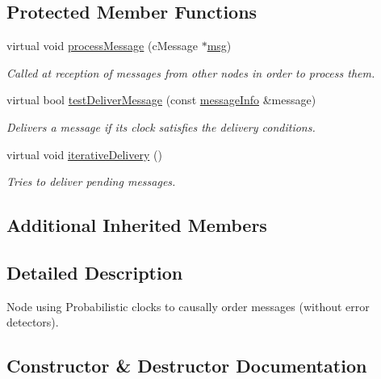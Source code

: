 \subsection*{Protected Member Functions}
\begin{DoxyCompactItemize}
\item 
virtual void \hyperlink{class_node_p_c_aa5fedc4136104a06e2f1131f1ba16b0e}{process\+Message} (c\+Message $\ast$\hyperlink{_controller_8h_afa0f3b802fbc219228f7bb97996fa558}{msg})
\begin{DoxyCompactList}\small\item\em Called at reception of messages from other nodes in order to process them. \end{DoxyCompactList}\item 
virtual bool \hyperlink{class_node_p_c_a54731196935596e0c6f094a5a8420134}{test\+Deliver\+Message} (const \hyperlink{structures_8h_a7e7bdc1d2fff8a9436f2f352b2711ed6}{message\+Info} \&message)
\begin{DoxyCompactList}\small\item\em Delivers a message if its clock satisfies the delivery conditions. \end{DoxyCompactList}\item 
virtual void \hyperlink{class_node_p_c_a7ac363db597ebadd3b18dd4343440aa1}{iterative\+Delivery} ()
\begin{DoxyCompactList}\small\item\em Tries to deliver pending messages. \end{DoxyCompactList}\end{DoxyCompactItemize}
\subsection*{Additional Inherited Members}


\subsection{Detailed Description}
Node using Probabilistic clocks to causally order messages (without error detectors). 



\subsection{Constructor \& Destructor Documentation}
\mbox{\label{class_node_p_c_a0b937d3f3d409fd1a8d1c15170d97675}} 
